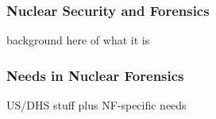 \begin{frame}
  \frametitle{Nuclear Security and Forensics}
  background here of what it is
\end{frame}

\begin{frame}
  \frametitle{Needs in Nuclear Forensics}
  US/DHS stuff plus NF-specific needs
\end{frame}

